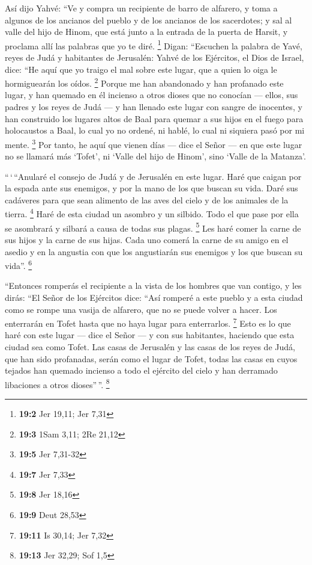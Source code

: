 \begin{paracol}{2}
 Así dijo Yahvé: ``Ve y compra un recipiente de barro de
alfarero, y toma a algunos de los ancianos del pueblo y de los ancianos
de los sacerdotes;  y sal al valle del hijo de Hinom, que
está junto a la entrada de la puerta de Harsit, y proclama allí las
palabras que yo te diré. \footnote{\textbf{19:2} Jer 19,11; Jer 7,31}
 Digan: ``Escuchen la palabra de Yavé, reyes de Judá y
habitantes de Jerusalén: Yahvé de los Ejércitos, el Dios de Israel,
dice: ``He aquí que yo traigo el mal sobre este lugar, que a quien lo
oiga le hormiguearán los oídos. \footnote{\textbf{19:3} 1Sam 3,11; 2Re
  21,12}  Porque me han abandonado y han profanado este
lugar, y han quemado en él incienso a otros dioses que no conocían ---
ellos, sus padres y los reyes de Judá --- y han llenado este lugar con
sangre de inocentes,  y han construido los lugares altos
de Baal para quemar a sus hijos en el fuego para holocaustos a Baal, lo
cual yo no ordené, ni hablé, lo cual ni siquiera pasó por mi mente.
\footnote{\textbf{19:5} Jer 7,31-32}  Por tanto, he aquí
que vienen días --- dice el Señor --- en que este lugar no se llamará
más `Tofet', ni `Valle del hijo de Hinom', sino `Valle de la Matanza'.

 ``\,`\,``Anularé el consejo de Judá y de Jerusalén en
este lugar. Haré que caigan por la espada ante sus enemigos, y por la
mano de los que buscan su vida. Daré sus cadáveres para que sean
alimento de las aves del cielo y de los animales de la tierra.
\footnote{\textbf{19:7} Jer 7,33}  Haré de esta ciudad un
asombro y un silbido. Todo el que pase por ella se asombrará y silbará a
causa de todas sus plagas. \footnote{\textbf{19:8} Jer 18,16}
 Les haré comer la carne de sus hijos y la carne de sus
hijas. Cada uno comerá la carne de su amigo en el asedio y en la
angustia con que los angustiarán sus enemigos y los que buscan su
vida''. \footnote{\textbf{19:9} Deut 28,53}

 ``Entonces romperás el recipiente a la vista de los
hombres que van contigo,  y les dirás: ``El Señor de los
Ejércitos dice: ``Así romperé a este pueblo y a esta ciudad como se
rompe una vasija de alfarero, que no se puede volver a hacer. Los
enterrarán en Tofet hasta que no haya lugar para enterrarlos.
\footnote{\textbf{19:11} Is 30,14; Jer 7,32}  Esto es lo
que haré con este lugar --- dice el Señor --- y con sus habitantes,
haciendo que esta ciudad sea como Tofet.  Las casas de
Jerusalén y las casas de los reyes de Judá, que han sido profanadas,
serán como el lugar de Tofet, todas las casas en cuyos tejados han
quemado incienso a todo el ejército del cielo y han derramado libaciones
a otros dioses''\,''. \footnote{\textbf{19:13} Jer 32,29; Sof 1,5}


\end{paracol}
